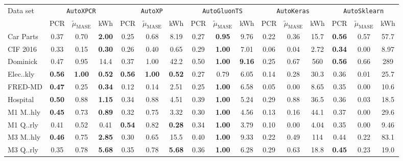 
    \begin{tabular}{l|ccc|ccc|ccc|ccc|ccc}
        \toprule 
        Data set & \multicolumn{3}{c}{\texttt{AutoXPCR}} & \multicolumn{3}{c}{\texttt{AutoXP}} & \multicolumn{3}{c}{\texttt{AutoGluonTS}} & \multicolumn{3}{c}{\texttt{AutoKeras}} & \multicolumn{3}{c}{\texttt{AutoSklearn}} \\
          & PCR & $\tilde{\mu}_{\text{MASE}}$ & kWh & PCR & $\tilde{\mu}_{\text{MASE}}$ & kWh & PCR & $\tilde{\mu}_{\text{MASE}}$ & kWh & PCR & $\tilde{\mu}_{\text{MASE}}$ & kWh & PCR & $\tilde{\mu}_{\text{MASE}}$ & kWh \\
        \midrule
        Car Parts & 0.37 & 0.70 & \textbf{2.00} & 0.25 & 0.68 & 8.19 & 0.27 & \textbf{0.95} & 9.76 & 0.22 & 0.36 & 15.7 & \textbf{0.56} & 0.57 & 57.7 \\
        CIF 2016 & 0.33 & 0.15 & \textbf{0.30} & 0.26 & 0.40 & 0.65 & 0.29 & \textbf{1.00} & 7.01 & 0.06 & 0.04 & 2.72 & \textbf{0.34} & 0.00 & 8.97 \\
        Dominick & 0.47 & 0.95 & 14.4 & 0.37 & 1.00 & 42.2 & 0.50 & \textbf{1.00} & \textbf{9.16} & 0.25 & 0.67 & 560 & \textbf{0.56} & 0.66 & 289 \\
        Elec..kly & \textbf{0.56} & \textbf{1.00} & \textbf{0.52} & \textbf{0.56} & \textbf{1.00} & \textbf{0.52} & 0.27 & 0.79 & 6.05 & 0.14 & 0.28 & 30.3 & 0.36 & 0.01 & 25.7 \\
        FRED-MD & \textbf{0.47} & 0.25 & \textbf{0.34} & 0.12 & 0.14 & 2.51 & 0.25 & \textbf{1.00} & 6.58 & 0.05 & 0.00 & 8.65 & 0.35 & 0.00 & 10.6 \\
        Hospital & \textbf{0.50} & 0.88 & \textbf{1.15} & 0.34 & 0.88 & 4.51 & 0.39 & \textbf{1.00} & 5.24 & 0.29 & 0.88 & 36.5 & 0.36 & 0.03 & 18.5 \\
        M1 M..hly & \textbf{0.45} & 0.73 & \textbf{0.89} & 0.32 & 0.75 & 3.32 & 0.30 & \textbf{1.00} & 4.56 & 0.13 & 0.16 & 44.1 & 0.37 & 0.00 & 29.6 \\
        M1 Q..rly & 0.41 & 0.52 & 0.41 & \textbf{0.54} & 0.82 & \textbf{0.28} & 0.34 & \textbf{1.00} & 3.79 & 0.10 & 0.00 & 4.04 & 0.35 & 0.00 & 9.46 \\
        M3 M..hly & \textbf{0.46} & 0.75 & \textbf{2.85} & 0.30 & 0.65 & 15.5 & 0.40 & \textbf{1.00} & 9.33 & 0.22 & 0.49 & 114 & 0.44 & 0.22 & 83.1 \\
        M3 Q..rly & 0.35 & 0.78 & \textbf{5.68} & 0.35 & 0.78 & \textbf{5.68} & 0.36 & \textbf{1.00} & 6.28 & 0.29 & 0.63 & 18.8 & \textbf{0.45} & 0.23 & 19.0 \\

\end{tabular}
